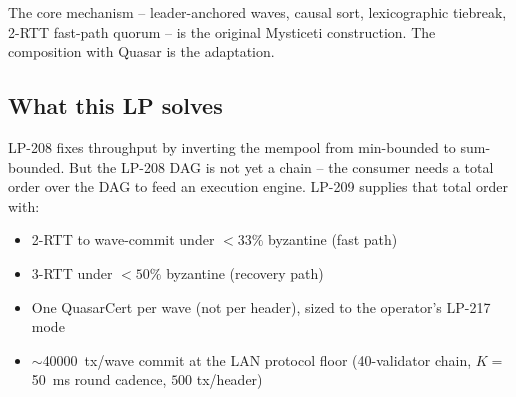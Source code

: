 The core mechanism -- leader-anchored waves, causal sort,
lexicographic tiebreak, 2-RTT fast-path quorum -- is the original
Mysticeti construction. The composition with Quasar is the
adaptation.

\subsection{What this LP solves}

LP-208 fixes throughput by inverting the mempool from
min-bounded to sum-bounded. But the LP-208 DAG is not yet a chain
-- the consumer needs a total order over the DAG to feed an
execution engine. LP-209 supplies that total order with:

\begin{itemize}[leftmargin=2em,nosep]
\item 2-RTT to wave-commit under $<33\%$ byzantine (fast path)
\item 3-RTT under $<50\%$ byzantine (recovery path)
\item One QuasarCert per wave (not per header), sized to the
  operator's LP-217 mode
\item $\sim$\SI{40000}{tx/wave} commit at the LAN protocol floor
  (40-validator chain, $K{=}$\SI{50}{\milli\second} round cadence,
  $500$ tx/header)
\end{itemize}
